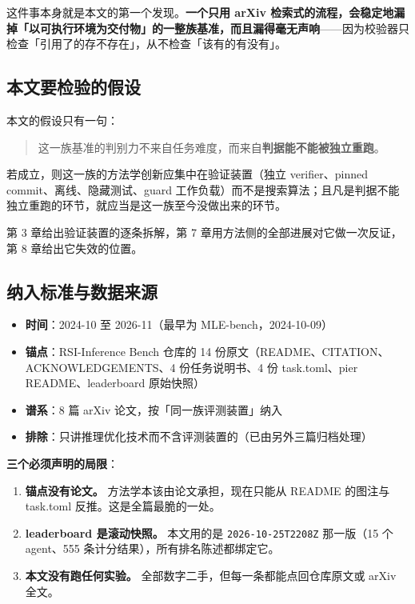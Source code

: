 这件事本身就是本文的第一个发现。\textbf{一个只用 arXiv 检索式的流程，会稳定地漏掉「以可执行环境为交付物」的一整族基准，而且漏得毫无声响}——因为校验器只检查「引用了的存不存在」，从不检查「该有的有没有」。


\subsection{本文要检验的假设}

本文的假设只有一句：


\begin{quote}\small
这一族基准的判别力不来自任务难度，而来自\textbf{判据能不能被独立重跑}。

\end{quote}

若成立，则这一族的方法学创新应集中在验证装置（独立 verifier、pinned commit、离线、隐藏测试、guard 工作负载）而不是搜索算法；且凡是判据不能独立重跑的环节，就应当是这一族至今没做出来的环节。


第 3 章给出验证装置的逐条拆解，第 7 章用方法侧的全部进展对它做一次反证，第 8 章给出它失效的位置。


\subsection{纳入标准与数据来源}

\begin{itemize}
  \item \textbf{时间}：2024-10 至 2026-11（最早为 MLE-bench，2024-10-09）
  \item \textbf{锚点}：RSI-Inference Bench 仓库的 14 份原文（README、CITATION、ACKNOWLEDGEMENTS、4 份任务说明书、4 份 task.toml、pier README、leaderboard 原始快照）
  \item \textbf{谱系}：8 篇 arXiv 论文，按「同一族评测装置」纳入
  \item \textbf{排除}：只讲推理优化技术而不含评测装置的（已由另外三篇归档处理）
\end{itemize}

 \textbf{三个必须声明的局限}：


\begin{enumerate}
  \item \textbf{锚点没有论文。} 方法学本该由论文承担，现在只能从 README 的图注与 task.toml 反推。这是全篇最脆的一处。
  \item \textbf{leaderboard 是滚动快照。} 本文用的是 \texttt{2026-10-25T2208Z} 那一版（15 个 agent、555 条计分结果），所有排名陈述都绑定它。
  \item \textbf{本文没有跑任何实验。} 全部数字二手，但每一条都能点回仓库原文或 arXiv 全文。
\end{enumerate}


